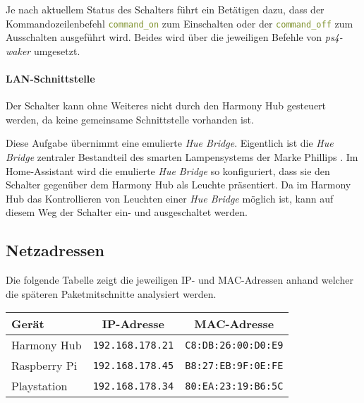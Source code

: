 

Je nach aktuellem Status des Schalters führt ein Betätigen dazu, dass der Kommandozeilenbefehl \lstinline[language=yaml]{command_on} zum Einschalten
oder der \lstinline[language=yaml]{command_off} zum Ausschalten ausgeführt wird.
Beides wird über die jeweiligen Befehle von \textit{ps4-waker} umgesetzt.

\paragraph{LAN-Schnittstelle}
Der Schalter kann ohne Weiteres nicht durch den Harmony Hub gesteuert werden,
da keine gemeinsame Schnittstelle vorhanden ist.

Diese Aufgabe übernimmt eine emulierte \textit{Hue Bridge}.
Eigentlich ist die \textit{Hue Bridge} zentraler Bestandteil des smarten Lampensystems der Marke Phillips \cite{HueBridg65:online}.
Im Home-Assistant wird die emulierte \textit{Hue Bridge} so konfiguriert,
dass sie den Schalter gegenüber dem Harmony Hub als Leuchte präsentiert.
Da im Harmony Hub das Kontrollieren von Leuchten einer \textit{Hue Bridge} möglich ist,
kann auf diesem Weg der Schalter ein- und ausgeschaltet werden.

\subsection{Netzadressen}\label{sec:aufbau-adressen}
Die folgende Tabelle zeigt die jeweiligen IP- und MAC-Adressen anhand welcher die
späteren Paketmitschnitte analysiert werden. \\

\begin{center}
    \begin{tabular}{l||c|c}
        Gerät           & IP-Adresse                &  MAC-Adresse          \\
        \hline
        \hline
        Harmony Hub     & \texttt{192.168.178.21}  &  \texttt{C8:DB:26:00:D0:E9}  \\
        \hline
        Raspberry Pi    & \texttt{192.168.178.45}  &  \texttt{B8:27:EB:9F:0E:FE}  \\
        \hline
        Playstation     & \texttt{192.168.178.34}  &  \texttt{80:EA:23:19:B6:5C}   \\
    \end{tabular}
\end{center}

